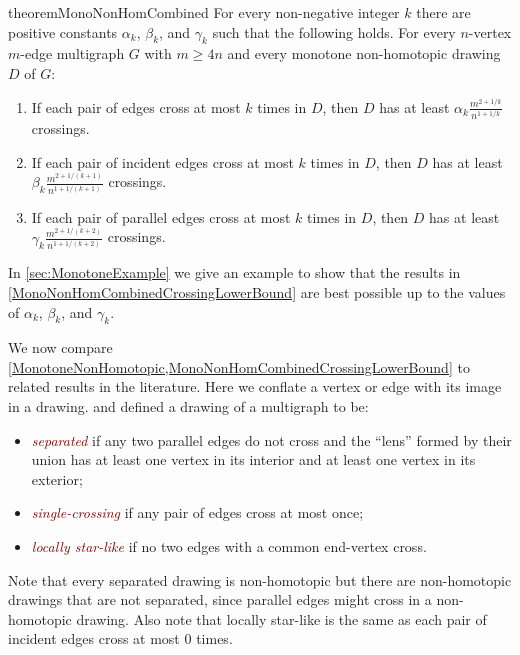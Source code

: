 \documentclass[a4paper,11pt]{article}
\renewcommand{\geq}{\geqslant}
\newcommand{\defn}[1]{\textcolor{Maroon}{\emph{#1}}}
\begin{document}
\begin{restatable}{theorem}{MonoNonHomCombined}\label{MonoNonHomCombinedCrossingLowerBound}
    For every non-negative integer $k$ there are positive constants $\alpha_k$, $\beta_k$, and $\gamma_k$ such that the following holds. For every $n$-vertex $m$-edge multigraph $G$ with $m \geq 4n$ and every monotone non-homotopic drawing $D$ of $G$\textup{:}
    \begin{enumerate}[label = \textup{(}\alph{*}\textup{)}]
        \item If each pair of edges cross at most $k$ times in $D$, then $D$ has at least $\alpha_k \frac{m^{2 + 1/k}}{n^{1 + 1/k}}$ crossings. \label{crossing:all}
        \item If each pair of incident edges cross at most $k$ times in $D$, then $D$ has at least $\beta_k \frac{m^{2 + 1/(k + 1)}}{n^{1 + 1/(k + 1)}}$ crossings. \label{crossing:incident}
        \item If each pair of parallel edges cross at most $k$ times in $D$, then $D$ has at least $\gamma_k \frac{m^{2 + 1/(k + 2)}}{n^{1 + 1/(k + 2)}}$ crossings. \label{crossing:parallel}
    \end{enumerate}
\end{restatable}

In \cref{sec:MonotoneExample} we give an example to show that the results in \cref{MonoNonHomCombinedCrossingLowerBound} are best possible up to the values of $\alpha_k$, $\beta_k$, and $\gamma_k$.


We now compare \cref{MonotoneNonHomotopic,MonoNonHomCombinedCrossingLowerBound} to related results in the literature. Here we conflate a vertex or edge with its image in a drawing.
 and \citet*{KPTU21} defined a drawing of a multigraph to be:
\begin{itemize}
    \item \defn{separated} if any two parallel edges do not cross and the ``lens'' formed by their union has at least one vertex in its interior and at least one vertex in its exterior;
    \item \defn{single-crossing} if any pair of edges cross at most once;
    \item \defn{locally star-like} if no two edges with a common end-vertex cross.
\end{itemize}

Note that every separated drawing is non-homotopic but there are non-homotopic drawings that are not separated, since parallel edges might cross in a non-homotopic drawing. Also note that locally star-like is the same as each pair of incident edges cross at most $0$ times.
\end{document}
